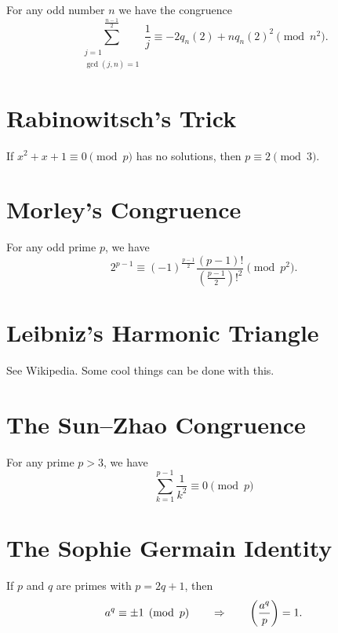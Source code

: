 \begin{theorem}
  For any odd number $n$ we have the congruence
  \begin{equation*}
    \sum_{\substack{j=1\\ \gcd(j,n)=1}}^{\frac{n-1}{2}}\frac{1}{j}\equiv -2 q_n(2)+ nq_n(2)^2\pmod{n^2}.
  \end{equation*}
\end{theorem}

\section{Rabinowitsch's Trick}

If $x^2+x+1\equiv 0\pmod{p}$ has no solutions, then $p\equiv 2\pmod{3}$.

\section{Morley's Congruence}

For any odd prime $p$, we have
\begin{equation*}
  2^{p-1}\equiv (-1)^{\frac{p-1}{2}}\frac{(p-1)!}{\left(\frac{p-1}{2}\right)!^2} \pmod{p^2}.
\end{equation*}

\section{Leibniz's Harmonic Triangle}

See Wikipedia. Some cool things can be done with this.

\section{The Sun--Zhao Congruence}

For any prime $p>3$, we have
\begin{equation*}
  \sum_{k=1}^{p-1}\frac{1}{k^2}\equiv 0\pmod{p}
\end{equation*}

\section{The Sophie Germain Identity}

If $p$ and $q$ are primes with $p=2q+1$, then
\begin{equation*}
  a^q\equiv\pm 1\pmod{p}\qquad\Rightarrow\qquad \legendre{a^q}{p}=1.
\end{equation*}

